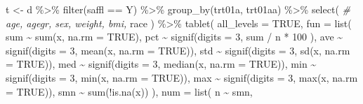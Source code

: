 \documentclass[
]{article}
\newenvironment{Shaded}{\begin{snugshade}}{\end{snugshade}}
\newcommand{\AttributeTok}[1]{\textcolor[rgb]{0.77,0.63,0.00}{#1}}
\newcommand{\CommentTok}[1]{\textcolor[rgb]{0.56,0.35,0.01}{\textit{#1}}}
\newcommand{\ConstantTok}[1]{\textcolor[rgb]{0.00,0.00,0.00}{#1}}
\newcommand{\DecValTok}[1]{\textcolor[rgb]{0.00,0.00,0.81}{#1}}
\newcommand{\FunctionTok}[1]{\textcolor[rgb]{0.00,0.00,0.00}{#1}}
\newcommand{\NormalTok}[1]{#1}
\newcommand{\OtherTok}[1]{\textcolor[rgb]{0.56,0.35,0.01}{#1}}
\newcommand{\SpecialCharTok}[1]{\textcolor[rgb]{0.00,0.00,0.00}{#1}}
\newcommand{\StringTok}[1]{\textcolor[rgb]{0.31,0.60,0.02}{#1}}
\begin{document}
\begin{Shaded}
\begin{Highlighting}[]
\NormalTok{t }\OtherTok{\textless{}{-}}\NormalTok{ d }\SpecialCharTok{\%\textgreater{}\%}
  \FunctionTok{filter}\NormalTok{(saffl }\SpecialCharTok{==} \StringTok{\textquotesingle{}Y\textquotesingle{}}\NormalTok{) }\SpecialCharTok{\%\textgreater{}\%}
  \FunctionTok{group\_by}\NormalTok{(trt01a, trt01aa) }\SpecialCharTok{\%\textgreater{}\%}
  \FunctionTok{select}\NormalTok{(}
  \CommentTok{\#  age, agegr, sex, weight, bmi,}
\NormalTok{    race}
\NormalTok{  ) }\SpecialCharTok{\%\textgreater{}\%}
  \FunctionTok{tablet}\NormalTok{(}
    \AttributeTok{all\_levels =} \ConstantTok{TRUE}\NormalTok{,}
    \AttributeTok{fun =} \FunctionTok{list}\NormalTok{(}
\NormalTok{      sum }\SpecialCharTok{\textasciitilde{}}  \FunctionTok{sum}\NormalTok{(x,  }\AttributeTok{na.rm =} \ConstantTok{TRUE}\NormalTok{),}
\NormalTok{      pct }\SpecialCharTok{\textasciitilde{}} \FunctionTok{signif}\NormalTok{(}\AttributeTok{digits =} \DecValTok{3}\NormalTok{,     sum }\SpecialCharTok{/}\NormalTok{ n }\SpecialCharTok{*} \DecValTok{100}\NormalTok{        ),}
\NormalTok{      ave }\SpecialCharTok{\textasciitilde{}} \FunctionTok{signif}\NormalTok{(}\AttributeTok{digits =} \DecValTok{3}\NormalTok{,    }\FunctionTok{mean}\NormalTok{(x,  }\AttributeTok{na.rm =} \ConstantTok{TRUE}\NormalTok{)),}
\NormalTok{      std }\SpecialCharTok{\textasciitilde{}} \FunctionTok{signif}\NormalTok{(}\AttributeTok{digits =} \DecValTok{3}\NormalTok{,      }\FunctionTok{sd}\NormalTok{(x,  }\AttributeTok{na.rm =} \ConstantTok{TRUE}\NormalTok{)),}
\NormalTok{      med }\SpecialCharTok{\textasciitilde{}} \FunctionTok{signif}\NormalTok{(}\AttributeTok{digits =} \DecValTok{3}\NormalTok{,  }\FunctionTok{median}\NormalTok{(x,  }\AttributeTok{na.rm =} \ConstantTok{TRUE}\NormalTok{)),}
\NormalTok{      min }\SpecialCharTok{\textasciitilde{}} \FunctionTok{signif}\NormalTok{(}\AttributeTok{digits =} \DecValTok{3}\NormalTok{,     }\FunctionTok{min}\NormalTok{(x,  }\AttributeTok{na.rm =} \ConstantTok{TRUE}\NormalTok{)),}
\NormalTok{      max }\SpecialCharTok{\textasciitilde{}} \FunctionTok{signif}\NormalTok{(}\AttributeTok{digits =} \DecValTok{3}\NormalTok{,     }\FunctionTok{max}\NormalTok{(x,  }\AttributeTok{na.rm =} \ConstantTok{TRUE}\NormalTok{)),}
\NormalTok{      smn }\SpecialCharTok{\textasciitilde{}} \FunctionTok{sum}\NormalTok{(}\SpecialCharTok{!}\FunctionTok{is.na}\NormalTok{(x))}
\NormalTok{    ),}
    \AttributeTok{num =} \FunctionTok{list}\NormalTok{(}
\NormalTok{      n }\SpecialCharTok{\textasciitilde{}}\NormalTok{ smn,}

\end{Highlighting}
\end{Shaded}
\end{document}
